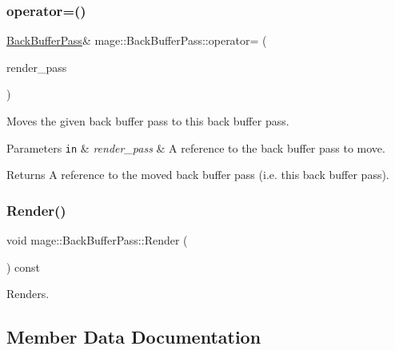 \subsubsection{\texorpdfstring{operator=()}{operator=()}\hspace{0.1cm}{\footnotesize\ttfamily [2/2]}}
{\footnotesize\ttfamily \hyperlink{classmage_1_1_back_buffer_pass}{Back\+Buffer\+Pass}\& mage\+::\+Back\+Buffer\+Pass\+::operator= (\begin{DoxyParamCaption}\item[{\hyperlink{classmage_1_1_back_buffer_pass}{Back\+Buffer\+Pass} \&\&}]{render\+\_\+pass }\end{DoxyParamCaption})\hspace{0.3cm}{\ttfamily [delete]}}

Moves the given back buffer pass to this back buffer pass.


\begin{DoxyParams}[1]{Parameters}
\mbox{\tt in}  & {\em render\+\_\+pass} & A reference to the back buffer pass to move. \\
\hline
\end{DoxyParams}
\begin{DoxyReturn}{Returns}
A reference to the moved back buffer pass (i.\+e. this back buffer pass). 
\end{DoxyReturn}
\hypertarget{classmage_1_1_back_buffer_pass_a6f0265c182a4b1ac2badd5df3fb11545}{}\label{classmage_1_1_back_buffer_pass_a6f0265c182a4b1ac2badd5df3fb11545} 
\subsubsection{\texorpdfstring{Render()}{Render()}}
{\footnotesize\ttfamily void mage\+::\+Back\+Buffer\+Pass\+::\+Render (\begin{DoxyParamCaption}{ }\end{DoxyParamCaption}) const\hspace{0.3cm}{\ttfamily [noexcept]}}

Renders. 

\subsection{Member Data Documentation}
\hypertarget{classmage_1_1_back_buffer_pass_a8cf9c4489733b17402dc33ed2dbe2bcc}{}\label{classmage_1_1_back_buffer_pass_a8cf9c4489733b17402dc33ed2dbe2bcc} 
